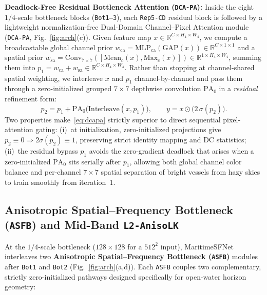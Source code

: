 \documentclass[journal,twoside]{IEEEtran}
\begin{document}
\textbf{Deadlock-Free Residual Bottleneck Attention (\texttt{DCA-PA}):} Inside the eight $1/4$-scale bottleneck blocks (\texttt{Bot1--3}), each \texttt{Rep5-CD} residual block is followed by a lightweight normalization-free Dual-Domain Channel--Pixel Attention module (\texttt{DCA-PA}, Fig.~\ref{fig:arch}(c)). Given feature map $x\in\mathbb{R}^{C\times H_4\times W_4}$, we compute a broadcastable global channel prior $w_{\mathrm{ca}} = \mathrm{MLP}_{\mathrm{ca}}(\mathrm{GAP}(x))\in\mathbb{R}^{C\times 1\times 1}$ and a spatial prior $w_{\mathrm{sa}} = \mathrm{Conv}_{7\times 7}([\mathrm{Mean}_c(x), \mathrm{Max}_c(x)])\in\mathbb{R}^{1\times H_4\times W_4}$, summing them into $p_1 = w_{\mathrm{ca}} + w_{\mathrm{sa}}\in\mathbb{R}^{C\times H_4\times W_4}$. Rather than stopping at channel-shared spatial weighting, we interleave $x$ and $p_1$ channel-by-channel and pass them through a zero-initialized grouped $7\times 7$ depthwise convolution $\mathrm{PA}_0$ in a \emph{residual} refinement form:
\begin{equation}
p_2 = p_1 + \mathrm{PA}_0\big(\mathrm{Interleave}(x, p_1)\big), \qquad y = x \odot \big(2\,\sigma(p_2)\big).
\label{eq:dcapa}
\end{equation}
Two properties make~\eqref{eq:dcapa} strictly superior to direct sequential pixel-attention gating: (i)~at initialization, zero-initialized projections give $p_2\equiv 0 \Rightarrow 2\sigma(p_2)\equiv 1$, preserving strict identity mapping and DC statistics; (ii)~the residual bypass $p_1$ avoids the zero-gradient deadlock that arises when a zero-initialized $\mathrm{PA}_0$ sits serially after $p_1$, allowing both global channel color balance and per-channel $7\times 7$ spatial separation of bright vessels from hazy skies to train smoothly from iteration~1.

\subsection{Anisotropic Spatial--Frequency Bottleneck (\texorpdfstring{\texttt{ASFB}}{ASFB}) and Mid-Band \texorpdfstring{\texttt{L2-AnisoLK}}{L2-AnisoLK}}
\label{sec:asfb}

At the $1/4$-scale bottleneck ($128\times 128$ for a $512^2$ input), MaritimeSFNet interleaves two \textbf{Anisotropic Spatial--Frequency Bottleneck (\texttt{ASFB})} modules after \texttt{Bot1} and \texttt{Bot2} (Fig.~\ref{fig:arch}(a,d)). Each \texttt{ASFB} couples two complementary, strictly zero-initialized pathways designed specifically for open-water horizon geometry:
\end{document}
